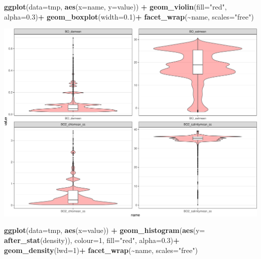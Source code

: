 \documentclass[
]{book}
\newenvironment{Shaded}{\begin{snugshade}}{\end{snugshade}}
\newcommand{\AttributeTok}[1]{\textcolor[rgb]{0.13,0.29,0.53}{#1}}
\newcommand{\DecValTok}[1]{\textcolor[rgb]{0.00,0.00,0.81}{#1}}
\newcommand{\FloatTok}[1]{\textcolor[rgb]{0.00,0.00,0.81}{#1}}
\newcommand{\FunctionTok}[1]{\textcolor[rgb]{0.13,0.29,0.53}{\textbf{#1}}}
\newcommand{\NormalTok}[1]{#1}
\newcommand{\SpecialCharTok}[1]{\textcolor[rgb]{0.81,0.36,0.00}{\textbf{#1}}}
\newcommand{\StringTok}[1]{\textcolor[rgb]{0.31,0.60,0.02}{#1}}
\begin{document}
\begin{Shaded}
\begin{Highlighting}[]
\FunctionTok{ggplot}\NormalTok{(}\AttributeTok{data=}\NormalTok{tmp, }\FunctionTok{aes}\NormalTok{(}\AttributeTok{x=}\NormalTok{name, }\AttributeTok{y=}\NormalTok{value)) }\SpecialCharTok{+} 
  \FunctionTok{geom\_violin}\NormalTok{(}\AttributeTok{fill=}\StringTok{"red"}\NormalTok{, }\AttributeTok{alpha=}\FloatTok{0.3}\NormalTok{)}\SpecialCharTok{+}
  \FunctionTok{geom\_boxplot}\NormalTok{(}\AttributeTok{width=}\FloatTok{0.1}\NormalTok{)}\SpecialCharTok{+}
  \FunctionTok{facet\_wrap}\NormalTok{(}\SpecialCharTok{\textasciitilde{}}\NormalTok{name, }\AttributeTok{scales=}\StringTok{"free"}\NormalTok{)}
\end{Highlighting}
\end{Shaded}

\includegraphics{_main_files/figure-latex/unnamed-chunk-48-2.pdf}

\begin{Shaded}
\begin{Highlighting}[]
\FunctionTok{ggplot}\NormalTok{(}\AttributeTok{data=}\NormalTok{tmp, }\FunctionTok{aes}\NormalTok{(}\AttributeTok{x=}\NormalTok{value)) }\SpecialCharTok{+} 
  \FunctionTok{geom\_histogram}\NormalTok{(}\FunctionTok{aes}\NormalTok{(}\AttributeTok{y=} \FunctionTok{after\_stat}\NormalTok{(density)), }\AttributeTok{colour=}\DecValTok{1}\NormalTok{, }\AttributeTok{fill=}\StringTok{"red"}\NormalTok{, }\AttributeTok{alpha=}\FloatTok{0.3}\NormalTok{)}\SpecialCharTok{+}
  \FunctionTok{geom\_density}\NormalTok{(}\AttributeTok{lwd=}\DecValTok{1}\NormalTok{)}\SpecialCharTok{+}
  \FunctionTok{facet\_wrap}\NormalTok{(}\SpecialCharTok{\textasciitilde{}}\NormalTok{name, }\AttributeTok{scales=}\StringTok{"free"}\NormalTok{)}
\end{Highlighting}
\end{Shaded}
\end{document}
